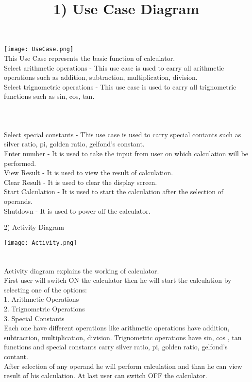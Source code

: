\documentclass[12pt]{article}
\begin{document}
\title{1) Use Case Diagram}
\date{\vspace{-5ex}}
\maketitle

\texttt{[image: UseCase.png]}\\

This Use Case represents the basic function of calculator.\\
Select arithmetic operations - This use case is used to carry all arithmetic operations such as addition, subtraction, multiplication, division.\\
Select trignometric operations - This use case is used to carry all trignometric functions such as sin, cos, tan.\\
\\\\\\
Select special constants - This use case is used to carry special contants such as silver ratio, pi, golden ratio, gelfond's constant.\\
Enter number - It is used to take the input from user on which calculation will be performed.\\
View Result - It is used to view the result of calculation.\\
Clear Result - It is used to clear the display screen.\\
Start Calculation - It is used to start the calculation after the selection of operands.\\
Shutdown - It is used to power off the calculator.\\

{\centering
{\LARGE 2) Activity Diagram \par}
\par}

\texttt{[image: Activity.png]}\\
\\\\

Activity diagram explains the working of calculator.\\
First user will switch ON the calculator then he will start the calculation by selecting one of the options:\\
1. Arithmetic Operations\\
2. Trignometric Operations\\
3. Special Constants\\
Each one have different operations like arithmetic operations have addition, subtraction, multiplication, division. Trignometric operations have sin, cos , tan functions and special constants carry silver ratio, pi, golden ratio, gelfond's contant.\\
After selection of any operand he will perform calculation and than he can view result of his calculation. At last user can switch OFF the calculator.
\end{document}

